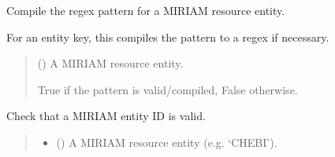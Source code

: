 \documentclass[letterpaper,12pt,english]{sphinxmanual}
\begin{document}
\begin{fulllineitems}
\begin{fulllineitems}
\begin{quote}
\begin{description}
\begin{itemize}
\end{itemize}

\sphinxAtStartPar
{}

\end{description}\end{quote}

\end{fulllineitems}


\begin{fulllineitems}
\label{\detokenize{api/core:cbmpy.CBCommon.MIRIAMannotation.checkEntityPattern}}
\pysigstartsignatures
\pysiglinewithargsret
{}
{}
{}
\pysigstopsignatures
\sphinxAtStartPar
Compile the regex pattern for a MIRIAM resource entity.

\sphinxAtStartPar
For an entity key, this compiles the pattern to a regex if necessary.
\begin{quote}\begin{description}
\sphinxAtStartPar
{} () \textendash{} A MIRIAM resource entity.

\sphinxAtStartPar
{} \textendash{} True if the pattern is valid/compiled, False otherwise.

\end{description}\end{quote}

\end{fulllineitems}


\begin{fulllineitems}
\label{\detokenize{api/core:cbmpy.CBCommon.MIRIAMannotation.checkId}}
\pysigstartsignatures
\pysiglinewithargsret
{}
{\sphinxparamcomma {}}
{}
\pysigstopsignatures
\sphinxAtStartPar
Check that a MIRIAM entity ID is valid.
\begin{quote}\begin{description}
\begin{itemize}
\item {} 
\sphinxAtStartPar
{} () \textendash{} A MIRIAM resource entity (e.g. ‘CHEBI’).


\end{itemize}
\end{description}
\end{quote}
\end{fulllineitems}
\end{fulllineitems}
\end{document}
